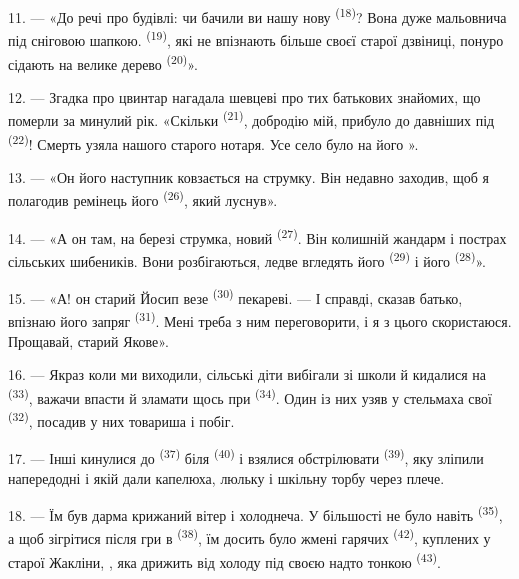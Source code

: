 11. --- «До речі про будівлі: чи бачили ви нашу нову 
\textsuperscript{(18)}? Вона дуже мальовнича під сніговою шапкою. 
\textsuperscript{(19)}, які не впізнають більше своєї старої дзвіниці, понуро
сідають на велике дерево  \textsuperscript{(20)}».

12. --- Згадка про цвинтар нагадала шевцеві про тих батькових знайомих, що
померли за минулий рік. «Скільки  \textsuperscript{(21)}, добродію
мій, прибуло до давніших під  \textsuperscript{(22)}! Смерть
узяла нашого старого нотаря. Усе село було на його ».

13. --- «Он його наступник ковзається на струмку. Він недавно заходив, щоб я
полагодив ремінець його  \textsuperscript{(26)}, який
луснув».

14. --- «А он там, на березі струмка, новий 
\textsuperscript{(27)}. Він колишній жандарм і пострах сільських шибеників. Вони
розбігаються, ледве вгледять його  \textsuperscript{(29)} і його
 \textsuperscript{(28)}».

15. --- «А! он старий Йосип везе  \textsuperscript{(30)}
пекареві. --- І справді, сказав батько, впізнаю його запряг 
\textsuperscript{(31)}. Мені треба з ним переговорити, і я з цього скористаюся.
Прощавай, старий Якове».

16. --- Якраз коли ми виходили, сільські діти вибігали зі школи й кидалися на
 \textsuperscript{(33)}, важачи впасти й зламати щось при
 \textsuperscript{(34)}. Один із них узяв у стельмаха свої
 \textsuperscript{(32)}, посадив у них товариша і побіг.

17. --- Інші кинулися до  \textsuperscript{(37)} біля
 \textsuperscript{(40)} і взялися обстрілювати  \textsuperscript{(39)}, яку зліпили напередодні і якій дали капелюха,
люльку і шкільну торбу через плече.

18. --- Їм був дарма крижаний вітер і холоднеча. У більшості не було навіть
 \textsuperscript{(35)}, а щоб зігрітися після гри в
 \textsuperscript{(38)}, їм досить було жмені гарячих
 \textsuperscript{(42)}, куплених у старої Жакліни,
, яка дрижить від холоду під своєю надто тонкою
 \textsuperscript{(43)}.

